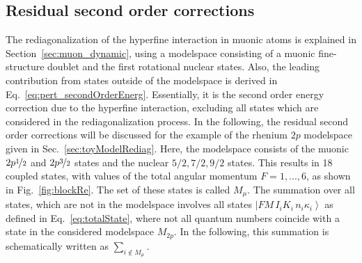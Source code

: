 \subsection{Residual second order corrections}
\label{sec:muon_residualSO}
The rediagonalization of the hyperfine interaction in muonic atoms is explained in Section~\ref{sec:muon_dynamic}, using a modelspace consisting of a muonic fine-structure doublet and the first rotational nuclear states. Also, the leading contribution from states outside of the modelspace is derived in Eq.~\eqref{eq:pert_secondOrderEnerg}. Essentially, it is the second order energy correction due to the hyperfine interaction, excluding all states which are considered in the rediagonalization process. In the following, the residual second order corrections will be discussed for the example of the rhenium $2p$ modelspace given in Sec.~\ref{sec:toyModelRediag}. Here, the modelspace consists of the muonic $2p\nicefrac{1}{2}$ and $2p\nicefrac{3}{2}$ states and the nuclear $5/2,7/2,9/2$ states. This results in 18 coupled states, with values of the total angular momentum $F=1,...,6$, as shown in Fig.~\ref{fig:blockRe}. The set of these states is called $M_{\mu}$. The summation over all states, which are not in the modelspace involves all states $\left|FM\,I_iK_i\,n_i\kappa_i\right>$ as defined in Eq.~\eqref{eq:totalState}, where not all quantum numbers coincide with a state in the considered modelspace $M_{2p}$. In the following, this summation is schematically written as $\sum_{i\notin M_{\mu}}$.

